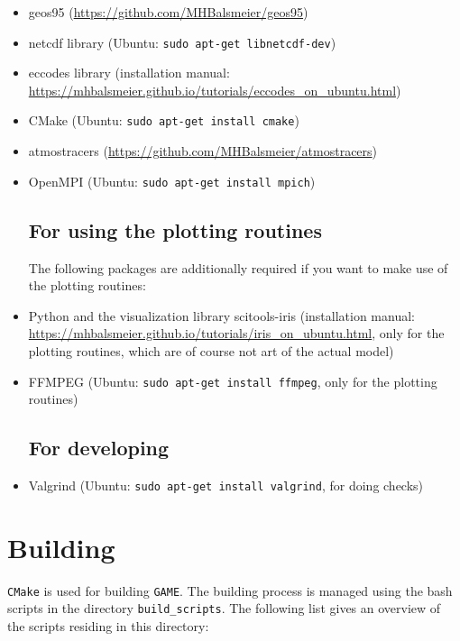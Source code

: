 \documentclass[10pt]{report}
\begin{document}
\begin{itemize}
\item geos95 (\url{https://github.com/MHBalsmeier/geos95})
\item netcdf library (Ubuntu: \texttt{sudo apt-get libnetcdf-dev})
\item eccodes library (installation manual: \url{https://mhbalsmeier.github.io/tutorials/eccodes_on_ubuntu.html})
\item CMake (Ubuntu: \texttt{sudo apt-get install cmake})
\item atmostracers (\url{https://github.com/MHBalsmeier/atmostracers})
\item OpenMPI (Ubuntu: \texttt{sudo apt-get install mpich})

\subsection{For using the plotting routines}
\label{sec:for_using_the_plotting_routines}

The following packages are additionally required if you want to make use of the plotting routines:
%
\item Python and the visualization library scitools-iris (installation manual: \url{https://mhbalsmeier.github.io/tutorials/iris_on_ubuntu.html}, only for the plotting routines, which are of course not art of the actual model)
\item FFMPEG (Ubuntu: \texttt{sudo apt-get install ffmpeg}, only for the plotting routines)

\subsection{For developing}
\label{sec:for_developing}

\item Valgrind (Ubuntu: \texttt{sudo apt-get install valgrind}, for doing checks)
\end{itemize}

\section{Building}
\label{sec:building}

\texttt{CMake} is used for building \texttt{GAME}. The building process is managed using the bash scripts in the directory \texttt{build\_scripts}. The following list gives an overview of the scripts residing in this directory:
\end{document}

